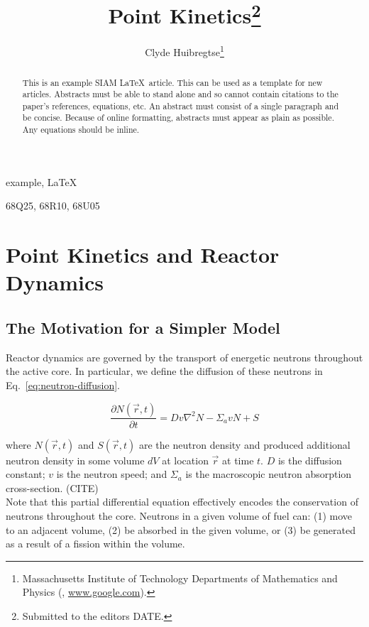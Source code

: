 \documentclass[review,onefignum,onetabnum]{siamart171218}
\title{Point Kinetics\thanks{Submitted to the editors DATE.}}
\author{Clyde Huibregtse\thanks{Massachusetts Institute of Technology Departments of Mathematics and Physics
  (\email{huibregc@mit.edu}, \url{www.google.com}).}}
\begin{document}
\maketitle

\begin{abstract}
  This is an example SIAM \LaTeX\ article. This can be used as a
  template for new articles.  Abstracts must be able to stand alone
  and so cannot contain citations to the paper's references,
  equations, etc.  An abstract must consist of a single paragraph and
  be concise. Because of online formatting, abstracts must appear as
  plain as possible. Any equations should be inline.
\end{abstract}

\begin{keywords}
  example, \LaTeX
\end{keywords}

\begin{AMS}
  68Q25, 68R10, 68U05
\end{AMS}

\section{Point Kinetics and Reactor Dynamics}

\subsection{The Motivation for a Simpler Model}
Reactor dynamics are governed by the transport of energetic neutrons
throughout the active core. In particular, we define the diffusion
of these neutrons in Eq.~\cref{eq:neutron-diffusion}.

\begin{equation}
  \label{eq:neutron-diffusion}
  \frac{\partial N(\vec{r}, t)}{\partial t} = Dv\nabla^2N - \Sigma_a v N + S
\end{equation}

where $N(\vec{r}, t)$ and $S(\vec{r}, t)$ are the neutron density and produced
additional neutron density in some volume $dV$ at location
$\vec{r}$ at time $t$.  $D$ is the diffusion constant; $v$ is the neutron
speed; and $\Sigma_a$ is the macroscopic neutron absorption cross-section. (CITE) \\

Note that this partial differential equation effectively encodes the
conservation of neutrons throughout the core. Neutrons in a given volume of
fuel can: (1) move to an adjacent volume, (2) be absorbed in the given
volume, or (3) be generated as a result of a fission within the volume.\\
\end{document}

